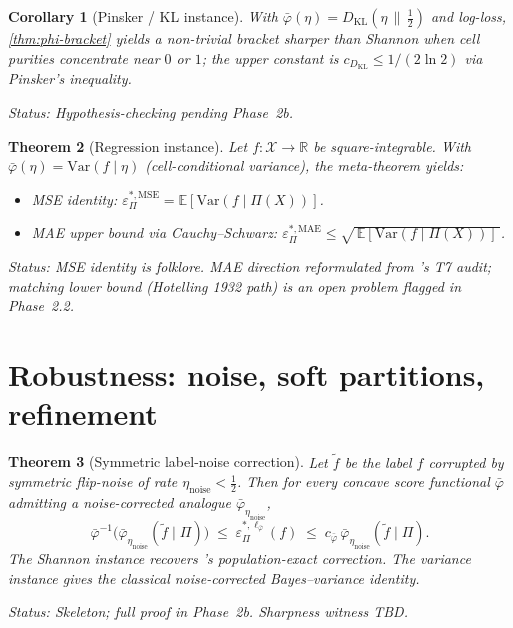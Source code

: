 \documentclass[10pt]{article}
\newtheorem{theorem}{Theorem}
\newtheorem{corollary}[theorem]{Corollary}
\theoremstyle{definition}
\theoremstyle{remark}
\newcommand{\eps}{\varepsilon}
\newcommand{\epsPL}[1]{\eps^{*,#1}_{\Pi}}
\newcommand{\E}{\mathbb{E}}
\newcommand{\Var}{\mathrm{Var}}
\newcommand{\KL}{D_{\mathrm{KL}}}
\newcommand{\bphi}{\bar{\varphi}}        %
\newcommand{\status}[1]{\par\noindent\emph{Status:} #1}
\begin{document}
\begin{corollary}[Pinsker / KL instance]\label{cor:pinsker}
With $\bphi(\eta)=\KL(\eta\,\|\,\tfrac12)$ and log-loss,
\cref{thm:phi-bracket} yields a non-trivial bracket sharper
than Shannon when cell purities concentrate near
$0$ or $1$; the upper constant is
$c_{\KL}\le 1/(2\ln 2)$ via Pinsker's inequality.
\status{Hypothesis-checking pending Phase~2b.}
\end{corollary}

\begin{theorem}[Regression instance]\label{thm:regression}
Let $f:\mathcal{X}\to\mathbb{R}$ be square-integrable. With
$\bphi(\eta)=\Var(f\mid\eta)$ (cell-conditional variance), the
meta-theorem yields:
\begin{itemize}[leftmargin=*,nosep]
  \item \emph{MSE identity:} $\epsPL{\mathrm{MSE}}=\E[\Var(f\mid\Pi(X))]$.
  \item \emph{MAE upper bound via Cauchy--Schwarz:}
        $\epsPL{\mathrm{MAE}}\le \sqrt{\,\E[\Var(f\mid\Pi(X))]\,}$.
\end{itemize}
\status{MSE identity is folklore. MAE direction reformulated
from \citetalias{paperA}'s T7 audit; matching lower bound
(Hotelling 1932 path) is an open problem flagged in Phase~2.2.}
\end{theorem}

\section{Robustness: noise, soft partitions, refinement}
\label{sec:robust}

\begin{theorem}[Symmetric label-noise correction]\label{thm:noise}
Let $\tilde f$ be the label $f$ corrupted by symmetric
flip-noise of rate $\eta_{\mathrm{noise}}<\tfrac12$. Then for
every concave score functional $\bphi$ admitting a noise-corrected
analogue $\bphi_{\eta_{\mathrm{noise}}}$,
\[
  \bphi^{-1}\!\bigl(\bphi_{\eta_{\mathrm{noise}}}(\tilde f\mid\Pi)\bigr)
  \;\le\;
  \epsPL{\ell_{\bphi}}(f)
  \;\le\;
  c_{\bphi}\,\bphi_{\eta_{\mathrm{noise}}}(\tilde f\mid\Pi).
\]
The Shannon instance recovers 's
population-exact correction. The variance instance gives the
classical noise-corrected Bayes--variance identity.
\status{Skeleton; full proof in Phase~2b. Sharpness witness
TBD.}
\end{theorem}
\end{document}

